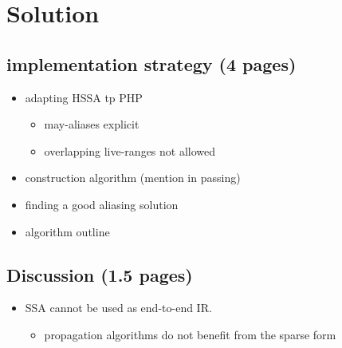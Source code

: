 \section{Solution}

\subsection{implementation strategy (4 pages)}
\begin{itemize}
	\item adapting HSSA tp PHP
	\begin{itemize}
		\item may-aliases explicit
		\item overlapping live-ranges not allowed
	\end{itemize}
	\item construction algorithm (mention in passing)
   \item finding a good aliasing solution
	\item algorithm outline
\end{itemize}

\subsection{Discussion (1.5 pages)}
\begin{itemize}
   \item SSA cannot be used as end-to-end IR.
	\begin{itemize}
	\item propagation algorithms do not benefit from the sparse form
	\end{itemize}
\end{itemize}


